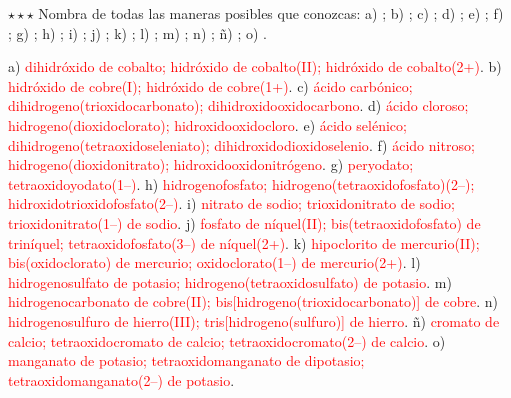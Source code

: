 \begin{exercise}
    \(\star\star\star\) Nombra de todas las maneras posibles que conozcas: a) ; b) ; c) ; d)
    ; e) ; f) ; g) ; h) ; i) ; j) ; k)
    ; l) ; m) ; n) ; ñ) ; o) .
    \begin{solu}
        a) \textcolor{red}{dihidróxido de cobalto; hidróxido de cobalto(II); hidróxido de cobalto(2+)}. b) \textcolor{red}{hidróxido
        de cobre(I); hidróxido de cobre(1+)}. c) \textcolor{red}{ácido carbónico; dihidrogeno(trioxidocarbonato);
        dihidroxidooxidocarbono}. d) \textcolor{red}{ácido cloroso; hidrogeno(dioxidoclorato); hidroxidooxidocloro}. e)
        \textcolor{red}{ácido selénico; dihidrogeno(tetraoxidoseleniato); dihidroxidodioxidoselenio}. f) \textcolor{red}{ácido
        nitroso; hidrogeno(dioxidonitrato); hidroxidooxidonitrógeno}. g) \textcolor{red}{peryodato; tetraoxidoyodato(1\nobreakdash--)}. h)
        \textcolor{red}{hidrogenofosfato; hidrogeno(tetraoxidofosfato)(2\nobreakdash--); hidroxidotrioxidofosfato(2\nobreakdash--)}. i)
        \textcolor{red}{nitrato de sodio; trioxidonitrato de sodio; trioxidonitrato(1\nobreakdash--) de sodio}. j) \textcolor{red}{fosfato de
        níquel(II); bis(tetraoxidofosfato) de triníquel; tetraoxidofosfato(3\nobreakdash--) de níquel(2+)}. k) \textcolor{red}{hipoclorito de
        mercurio(II); bis(oxidoclorato) de mercurio; oxidoclorato(1\nobreakdash--) de mercurio(2+)}. l) \textcolor{red}{hidrogenosulfato de
        potasio; hidrogeno(tetraoxidosulfato) de potasio}. m) \textcolor{red}{hidrogenocarbonato de cobre(II);
        bis[hidrogeno(trioxidocarbonato)] de cobre}. n) \textcolor{red}{hidrogenosulfuro de hierro(III); tris[hidrogeno(sulfuro)] de
        hierro}. ñ) \textcolor{red}{cromato de calcio; tetraoxidocromato de calcio; tetraoxidocromato(2\nobreakdash--) de calcio}. o)
        \textcolor{red}{manganato de potasio; tetraoxidomanganato de dipotasio; tetraoxidomanganato(2\nobreakdash--) de potasio}.
    \end{solu}
\end{exercise}

